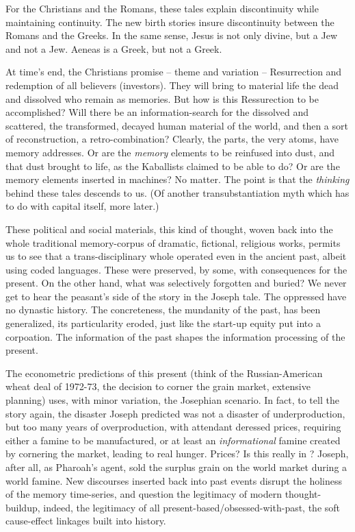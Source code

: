For the Christians and the Romans, these tales explain discontinuity while maintaining continuity. The new birth stories insure discontinuity between the Romans and the Greeks. In the same sense, Jesus is not only divine, but a Jew and not a Jew. Aeneas is a Greek, but not a Greek.

At time's end, the Christians promise -- theme and variation -- Resurrection and redemption of all believers (investors). They will bring to material life the dead and dissolved who remain as memories. But how is this Ressurection to be accomplished? Will there be an information-search for the dissolved and scattered, the transformed, decayed human material of the world, and then a sort of reconstruction, a retro-combination? Clearly, the parts, the very atoms, have memory addresses. Or are the \emph{memory} elements to be reinfused into dust, and that dust brought to life, as the Kaballists claimed to be able to do? Or are the memory elements inserted in machines? No matter. The point is that the \emph{thinking} behind these tales descends to us. (Of another transubstantiation myth which has to do with capital itself, more later.)

These political and social materials, this kind of thought, woven back into the whole traditional memory-corpus of dramatic, fictional, religious works, permits us to see that a trans-disciplinary whole operated even in the ancient past, albeit using coded languages. These were preserved, by some, with consequences for the present. On the other hand, what was selectively forgotten and buried? We never get to hear the peasant's side of the story in the Joseph tale. The oppressed have no dynastic history. The concreteness, the mundanity of the past, has been generalized, its particularity eroded, just like the start-up equity put into a corpoation. The information of the past shapes the information processing of the present.

The econometric predictions of this present (think of the Russian-American wheat deal of 1972-73, the decision to corner the grain market, extensive planning) uses, with minor variation, the Josephian scenario. In fact, to tell the story again, the disaster Joseph predicted was not a disaster of underproduction, but too many years of overproduction, with attendant deressed prices, requiring either a famine to be manufactured, or at least an \emph{informational} famine created by cornering the market, leading to real hunger. Prices? Is this really in ? Joseph, after all, as Pharoah's agent, sold the surplus grain on the world market during a world famine. New discourses inserted back into past events disrupt the holiness of the memory time-series, and question the legitimacy of modern thought-buildup, indeed, the legitimacy of all present-based\slash obsessed-with-past, the soft cause-effect linkages built into history.
